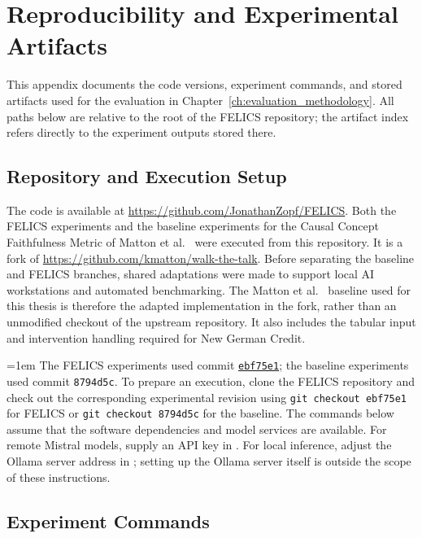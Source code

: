 \chapter{Reproducibility and Experimental Artifacts}
\label{app:reproducibility}

This appendix documents the code versions, experiment commands, and stored artifacts used for the evaluation in Chapter~\ref{ch:evaluation_methodology}. All paths below are relative to the root of the FELICS repository; the artifact index refers directly to the experiment outputs stored there.

\section*{Repository and Execution Setup}

The code is available at \url{https://github.com/JonathanZopf/FELICS}. Both the FELICS experiments and the baseline experiments for the Causal Concept Faithfulness Metric of Matton et al.~\cite{mattonWalkTalkMeasuring2024} were executed from this repository. It is a fork of \url{https://github.com/kmatton/walk-the-talk}. Before separating the baseline and FELICS branches, shared adaptations were made to support local AI workstations and automated benchmarking. The Matton et al.~\cite{mattonWalkTalkMeasuring2024} baseline used for this thesis is therefore the adapted implementation in the fork, rather than an unmodified checkout of the upstream repository. It also includes the tabular input and intervention handling required for New German Credit.

\begingroup
\emergencystretch=1em
The FELICS experiments used commit \href{https://github.com/JonathanZopf/FELICS/commit/ebf75e138b0c0cb8aaab9e3d32ca9e9bee9a1d4b}{\texttt{ebf75e1}}; the baseline experiments used commit \texttt{8794d5c}.
To prepare an execution, clone the FELICS repository and check out the corresponding experimental revision using \texttt{git checkout ebf75e1} for FELICS or \texttt{git checkout 8794d5c} for the baseline. The commands below assume that the software dependencies and model services are available. For remote Mistral models, supply an API key in . For local inference, adjust the Ollama server address in ; setting up the Ollama server itself is outside the scope of these instructions.
\par\endgroup

\section*{Experiment Commands}

